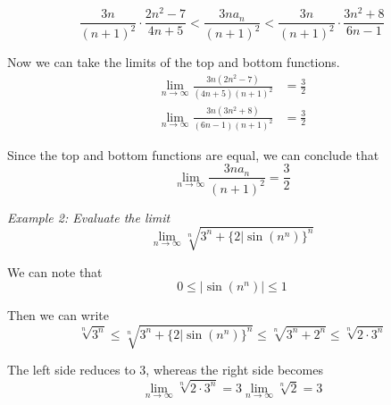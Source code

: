         \begin{equation*}
            \frac{3n}{(n+1)^2}\cdot\frac{2n^2-7}{4n+5}<\frac{3na_n}{(n+1)^2}<\frac{3n}{(n+1)^2}\cdot\frac{3n^2+8}{6n-1}
        \end{equation*}

        \noindent Now we can take the limits of the top and bottom functions. \\

        \begin{align*}
            \lim_{n\to \infty}\frac{3n(2n^2-7)}{(4n+5)(n+1)^2} &= \frac{3}{2} \\
            \lim_{n\to\infty}\frac{3n(3n^2+8)}{(6n-1)(n+1)^2} &= \frac{3}{2}
        \end{align*}

        \noindent Since the top and bottom functions are equal, we can conclude that \\

        \begin{equation*}
            \lim_{n\to\infty} \frac{3na_n}{(n+1)^2}=\frac{3}{2}
        \end{equation*}

        \noindent \color{blue} \textit{Example 2: Evaluate the limit} \\

        \begin{equation*}
            \lim_{n\to\infty}\sqrt[n]{3^n+\{2|\sin{(n^n)}\}^n}
        \end{equation*}

        \color{black} \noindent We can note that \\

        \begin{equation*}
            0\leq|\sin{(n^n)}|\leq1
        \end{equation*}

        \noindent Then we can write \\

        \begin{equation*}
            \sqrt[n]{3^n}\leq\sqrt[n]{3^n+\{2|\sin{(n^n)}\}^n}\leq\sqrt[n]{3^n+2^n}\leq\sqrt[n]{2\cdot3^n}
        \end{equation*}

        \noindent The left side reduces to 3, whereas the right side becomes \\

        \begin{equation*}
            \lim_{n\to\infty}\sqrt[n]{2\cdot3^n} = 3\lim_{n\to\infty}\sqrt[n]{2}=3
        \end{equation*}

